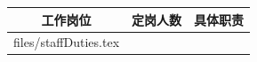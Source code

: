 \documentclass[a4paper]{article}
\makeatletter
\newcommand{\erpTabInput}[1]{\@@input#1 }
\makeatother
\begin{document}
\begin{tabular}{|c|c|c|}
\hline
工作岗位 & 定岗人数 & 具体职责 \\
\hline
\erpTabInput{files/staffDuties.tex}
\end{tabular}
\end{document}
